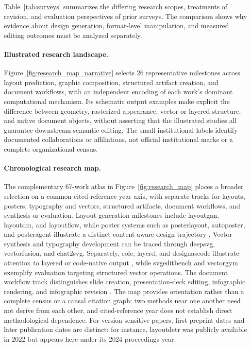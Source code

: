 Table~\ref{tab:surveys} summarizes the differing research scopes, treatments of revision, and evaluation perspectives of prior surveys.
The comparison shows why evidence about design generation, format-level manipulation, and measured editing outcomes must be analyzed separately.



\paragraph{Illustrated research landscape.}
Figure~\ref{fig:research_map_narrative} selects 26 representative milestones across layout prediction, graphic composition, structured artifact creation, and document workflows, with an independent encoding of each work's dominant computational mechanism.
Its schematic output examples make explicit the difference between geometry, rasterized appearance, vector or layered structure, and native document objects, without asserting that the illustrated studies all guarantee downstream semantic editing.
The small institutional labels identify documented collaborations or affiliations, not official institutional marks or a complete organizational census.

\paragraph{Chronological research map.}
The complementary 67-work atlas in Figure~\ref{fig:research_map} places a broader selection on a common cited-reference-year axis, with separate tracks for layouts, posters, typography and vectors, structured artifacts, document workflows, and synthesis or evaluation.
Layout-generation milestones include \ac{layoutgan}, \ac{layoutdm}, and \ac{layoutflow}, while poster systems such as \ac{posterlayout}, \ac{autoposter}, and \ac{posteragent} illustrate a distinct content-aware design trajectory \citep{autoposter2023}.
Vector synthesis and typography development can be traced through \ac{deepsvg}, \ac{vectorfusion}, and \ac{chat2svg}.
Separately, \ac{cole}, \ac{layerd}, and \ac{designascode} illustrate attention to layered or code-native output \citep{cole2023,designascode2026}, while \ac{svgeditbench} and \ac{vectorgym} exemplify evaluation targeting structured vector operations.
The document workflow track distinguishes slide creation, presentation-deck editing, infographic rendering, and infographic revision \citep{autopresent2025,pptagent2025,bizgen2025,pptarena2025,yang2026infoedit}.
The map provides orientation rather than a complete census or a causal citation graph: two methods near one another need not derive from each other, and cited-reference year does not establish direct methodological dependence.
For version-sensitive papers, first-preprint dates and later publication dates are distinct: for instance, \ac{layoutdetr} was publicly available in 2022 but appears here under its 2024 proceedings year.


